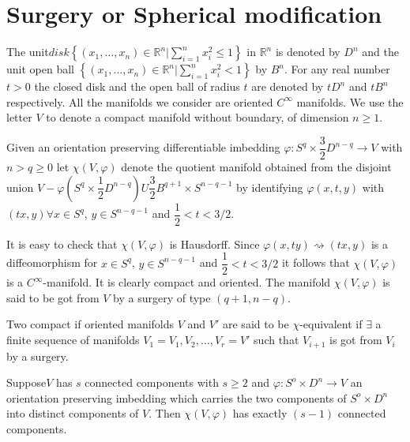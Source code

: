 \section{Surgery or Spherical modification}\label{chap1:sec3} %

The unit\pageoriginale $disk \left\{(x_1,\ldots,x_n)\in
\mathbb{R}^n \big| \sum\limits^{n}_{i = 1} x^2_i \leq 1\right\}$ in
$\mathbb{R}^n$ is denoted by $D^n$ and the unit open ball
$\left\{(x_1,\ldots, x_n) \in \mathbb{R}^n
\bigg|\sum\limits^n_{i =1}x^2_i<1\right \}$ by 
$B^n$. For any real number $t > 0$ the closed disk and the open ball
of radius $t$ are denoted by $tD^n$ and $tB^n$ respectively. All the
manifolds we consider are oriented $C^\infty$ manifolds. We use the
letter $V$ to denote a compact manifold without boundary, of dimension
$n \geq 1$.  

\begin{definition}%
Given an orientation preserving differentiable imbedding $\varphi: S^q
\times \dfrac{3}{2}D^{n-q} \rightarrow V$ with $n > q \geq 0$ let
$\chi (V, \varphi)$ denote the quotient manifold obtained from the
disjoint union $V-\varphi(S^q \times \dfrac{1}{2}
D^{n-q})U\dfrac{3}{2} B^{q+1}\times S^{n-q-1}$ by identifying
$\varphi(x, t, y)$ with $(tx, y) \forall x \in S^q$, $y \in
S^{n-q-1}$ and $\dfrac{1}{2} < t < 3/2$.  
\end{definition}

It is easy to check that $\chi(V,\varphi)$ is Hausdorff. Since $\varphi
(x, ty) \rightsquigarrow(tx, y)$ is a diffeomorphism for $x\in
S^q$, $y\in S^{n-q-1}$ and $\dfrac{1}{2}<t<3/2$ it follows that
$\chi (V, \varphi)$ is a $C^\infty$-manifold. It is clearly compact
and oriented. The manifold $\chi(V, \varphi)$ is said to be got from
$V$ by a surgery of type $(q+1, n-q)$.  

Two compact if oriented manifolds $V$ and $V'$ are said to be
$\chi$-equi\-val\-ent if $\exists$ a finite sequence of manifolds $V_1 =
V_1, V_2, \ldots, V_r = V'$ such that $V_{i+1}$ is got from $V_i$ by a
surgery.  

\setcounter{lemma}{1}
\begin{lemma}\label{chap1:lem3.2}%
Suppose\pageoriginale $V$ has $s$ connected components with $s \geq
2$ and 
$\varphi: S^o \times D^n \rightarrow V$ an orientation preserving
imbedding which carries the two components of $ S^o \times D^n$
into distinct components of $V$. Then $\chi (V,\varphi)$ has exactly
$(s-1)$ connected components.  
\end{lemma}

